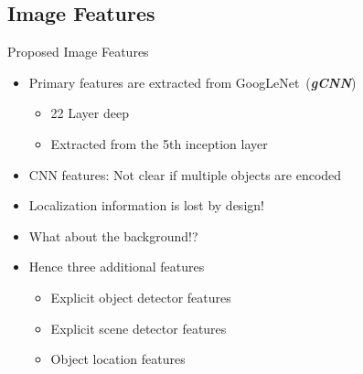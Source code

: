 \documentclass{beamer}
\begin{document}
\subsection{Image Features}
\begin{frame}{Proposed Image Features}
    \begin{itemize}
            \item Primary features are extracted from GoogLeNet~(\textbf{\emph{gCNN}})
        \begin{itemize}
            \item 22 Layer deep
            \item Extracted from the 5th inception layer 
        \end{itemize}
        \item CNN features: Not clear if multiple objects are encoded 
        \item Localization information is lost by design! 
        \item What about the background!? 
        \item Hence three additional features 
           \begin{itemize}
               \item Explicit object detector features
               \item Explicit scene detector features 
               \item Object location features 
           \end{itemize}
    \end{itemize}
\end{frame}
\end{document}
